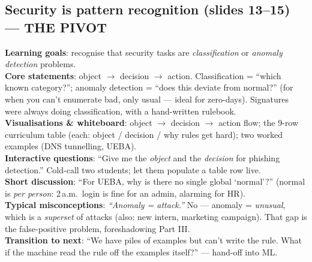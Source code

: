 \documentclass[11pt,a4paper]{article}
\newcommand{\obj}{\textbf{\color{accent}Learning goals}}
\newcommand{\core}{\textbf{\color{accent}Core statements}}
\newcommand{\viz}{\textbf{\color{accent}Visualisations \& whiteboard}}
\newcommand{\ask}{\textbf{\color{accent}Interactive questions}}
\newcommand{\disc}{\textbf{\color{accent}Short discussion}}
\newcommand{\misc}{\textbf{\color{bad}Typical misconceptions}}
\newcommand{\trans}{\textbf{\color{mlsig}Transition to next}}
\begin{document}
\subsection{Security is pattern recognition (slides 13--15) --- THE PIVOT}
\obj: recognise that security tasks are \emph{classification} or \emph{anomaly
detection} problems.\\
\core: object $\to$ decision $\to$ action. Classification = ``which known
category?''; anomaly detection = ``does this deviate from normal?'' (for when you
can't enumerate bad, only usual --- ideal for zero-days). Signatures were always
doing classification, with a hand-written rulebook.\\
\viz: object $\to$ decision $\to$ action flow; the 9-row curriculum table (each:
object / decision / why rules get hard); two worked examples (DNS tunnelling,
UEBA).\\
\ask: ``Give me the \emph{object} and the \emph{decision} for phishing detection.''
Cold-call two students; let them populate a table row live.\\
\disc: ``For UEBA, why is there no single global `normal'?'' (normal is
\emph{per person}: 2\,a.m.\ login is fine for an admin, alarming for HR).\\
\misc: \emph{``Anomaly = attack.''} No --- anomaly = \emph{unusual}, which is a
\emph{superset} of attacks (also: new intern, marketing campaign). That gap is
the false-positive problem, foreshadowing Part III.\\
\trans: ``We have piles of examples but can't write the rule. What if the machine
read the rule off the examples itself?'' --- hand-off into ML.
\end{document}
